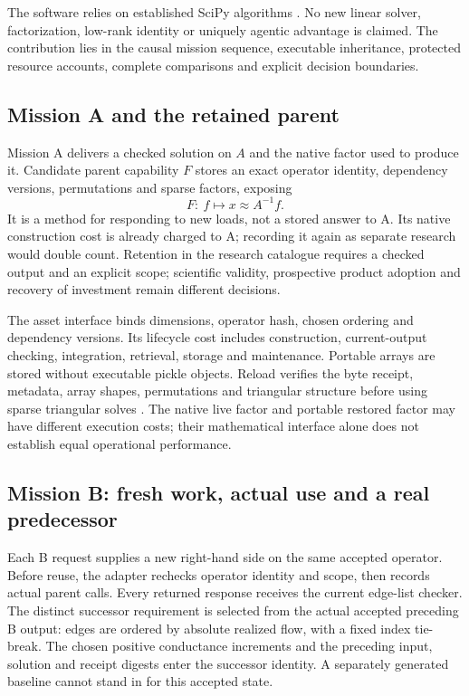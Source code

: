 The software relies on established SciPy algorithms \citep{virtanen2020scipy}. No new linear solver,
factorization, low-rank identity or uniquely agentic advantage is claimed. The contribution lies in the
causal mission sequence, executable inheritance, protected resource accounts, complete comparisons and
explicit decision boundaries.

\subsection{Mission A and the retained parent}

Mission A delivers a checked solution on $A$ and the native factor used to produce it. Candidate parent capability $F$ stores an exact operator
identity, dependency versions, permutations and sparse factors, exposing
\begin{equation}
 F:\ f\longmapsto x\approx A^{-1}f.
\end{equation}
It is a method for responding to new loads, not a stored answer to A. Its native construction cost is already
charged to A; recording it again as separate research would double count. Retention in the research catalogue requires a checked output and an explicit
scope; scientific validity, prospective product adoption and recovery of investment remain different decisions.

The asset interface binds dimensions, operator hash, chosen ordering and dependency versions. Its lifecycle
cost includes construction, current-output checking, integration, retrieval, storage and maintenance. Portable
arrays are stored without executable pickle objects. Reload verifies the byte receipt, metadata, array shapes,
permutations and triangular structure before using sparse triangular solves \citep{scipy117triangular}.
The native live factor and portable restored factor may have different execution costs; their mathematical
interface alone does not establish equal operational performance.

\subsection{Mission B: fresh work, actual use and a real predecessor}

Each B request supplies a new right-hand side on the same accepted operator. Before reuse, the adapter
rechecks operator identity and scope, then records actual parent calls. Every returned response receives
the current edge-list checker. The distinct successor requirement is selected from the actual accepted
preceding B output: edges are ordered by absolute realized flow, with a fixed index tie-break. The chosen
positive conductance increments and the preceding input, solution and receipt digests enter the successor
identity. A separately generated baseline cannot stand in for this accepted state.

